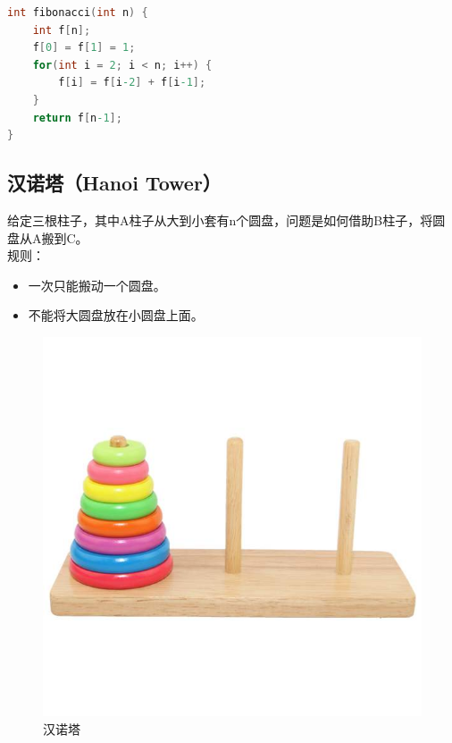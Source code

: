 \vspace{0.5cm}


\begin{lstlisting}[language=C]
int fibonacci(int n) {
    int f[n];
    f[0] = f[1] = 1;
    for(int i = 2; i < n; i++) {
        f[i] = f[i-2] + f[i-1];
    }
    return f[n-1];
}
\end{lstlisting}

\subsection{汉诺塔（Hanoi Tower）}

给定三根柱子，其中A柱子从大到小套有n个圆盘，问题是如何借助B柱子，将圆盘从A搬到C。 \\

规则：

\begin{itemize}
    \item 一次只能搬动一个圆盘。
    \item 不能将大圆盘放在小圆盘上面。
\end{itemize}

\begin{figure}[H]
    \centering
    \includegraphics[scale=0.4]{img/C11/11-3/1.png}
    \caption{汉诺塔}
\end{figure}

